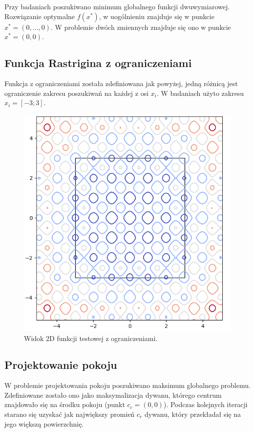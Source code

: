 Przy badaniach poszukiwano minimum globalnego funkcji dwuwymiarowej. Rozwiązanie optymalne $f(x^{*})$, w uogólnieniu znajduje się w punkcie $x^{*} = (0, ..., 0)$. W problemie dwóch zmiennych znajduje się ono w punkcie $x^{*} = (0, 0)$.

\pagebreak

\subsection{Funkcja Rastrigina z ograniczeniami}

Funkcja z ograniczeniami została zdefiniowana jak powyżej, jedną różnicą jest ograniczenie zakresu poszukiwań na każdej z osi $x_{i}$. W badaniach użyto zakresu $x_{i} = [-3; 3]$.

\begin{figure}[H]
	\centering
	\includegraphics[width=0.4\linewidth]{imgs/rastrigin_2d_limited_plot}
	\caption{Widok 2D funkcji testowej z ograniczeniami.}
	\label{fig:rastrigin_2d_limited_plot}
\end{figure}

\pagebreak

\subsection{Projektowanie pokoju}

W problemie projektowania pokoju poszukiwano maksimum globalnego problemu. Zdefiniowane zostało ono jako maksymalizacja dywanu, którego centrum znajdowało się na środku pokoju (punkt $c_{c} = (0, 0)$). Podczas kolejnych iteracji starano się uzyskać jak największy promień $c_{r}$ dywanu, który przekładał się na jego większą powierzchnię. 

